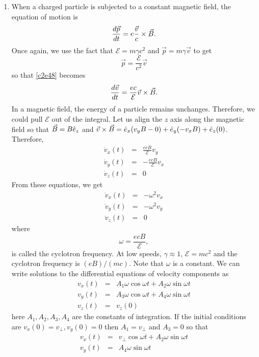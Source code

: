\begin{enumerate}
\item When a charged particle is subjected to a constant magnetic field, the
equation of motion is
\begin{equation}\label{c3e49}
\frac{d{\vec{p}}}{d{t}} = e\frac{\vec{v}}{c} \times \vec{B}.
\end{equation}
Once again, we use the fact that $\mathcal{E} = m\gamma c^2$ and $\vec{p} = 
m\gamma\vec{v}$ to get
\[
\vec{p} = \frac{\mathcal{E}}{c^2}\vec{v}
\]
so that \eqref{c2e48} becomes
\[
\frac{d{\vec{v}}}{d{t}} = \frac{ec}{\mathcal{E}}\vec{v} \times \vec{B}.
\]
In a magnetic field, the energy of a particle remains unchanges. Therefore, we 
could pull $\mathcal{E}$ out of the integral. Let us align the $z$ axis along
the magnetic field so that $\vec{B} = B\hat{e}_{z}$ and $\vec{v} \times \vec{B} = 
\hat{e}_{x}(v_yB - 0) + \hat{e}_{y}(-v_xB) + \hat{e}_{z}(0)$. Therefore,
\begin{eqnarray*}
\dot{v}_x(t) &=& \frac{ecB}{\mathcal{E}}v_y \\
\dot{v}_y(t) &=& -\frac{ecB}{\mathcal{E}}v_x \\
\dot{v}_z(t) &=& 0
\end{eqnarray*}
From these equations, we get
\begin{eqnarray*}
\ddot{v}_x(t) &=& -\omega^2 v_x \\
\ddot{v}_y(t) &=& -\omega^2 v_y \\
\ddot{v}_z(t) &=& 0
\end{eqnarray*}
where
\begin{equation}\label{c3e50}
\omega = \frac{ecB}{\mathcal{E}},
\end{equation}
is called the cyclotron frequency. At low speeds, $\gamma \approx 1$, $\mathcal{E}
= mc^2$ and the cyclotron frequency is $(eB)/(mc)$. Note that $\omega$ is a 
constant. We can write solutions to the differential equations of velocity
components as
\begin{eqnarray*}
v_x(t) &=& A_1\omega\cos\omega t + A_2\omega\sin\omega t \\
v_y(t) &=& A_3\omega\cos\omega t + A_4\omega\sin\omega t \\
v_z(t) &=& v_z(0)
\end{eqnarray*}
here $A_1, A_2, A_3, A_4$ are the constants of integration. If the initial
conditions are $v_x(0) = v_{\perp}, v_y(0) = 0$ then $A_1 = v_{\perp}$ and 
$A_3 = 0$ so that
\begin{eqnarray*}
v_x(t) &=& v_\perp\cos\omega t + A_2\omega\sin\omega t \\
v_y(t) &=& A_4\omega\sin\omega t \\

\end{eqnarray*}
\end{enumerate}
